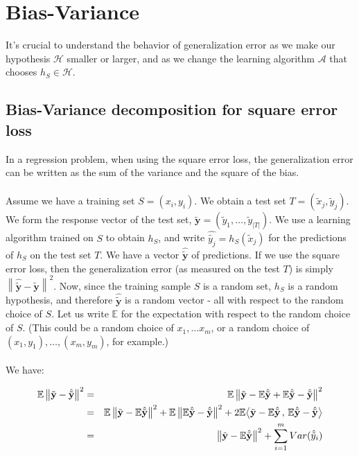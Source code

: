 \documentclass[11pt]{article}
\newcommand{\norm}[1]{\left\| #1\right\|}
\newcommand{\Ac}{\mathcal{A}}
\newcommand{\Hc}{\mathcal{H}}
\newcommand{\innerr}[2]{{\left\langle #1\,,\,#2 \right\rangle}}
\newcommand{\V}[1]{\mathbf{#1}}
\begin{document}
\section{Bias-Variance}

It's crucial to understand the behavior of generalization error as we make our
hypothesis $\Hc$ smaller or larger, and as we change the learning algorithm
$\Ac$ that chooses $h_S\in\Hc$. 


\subsection{Bias-Variance decomposition for square error loss}

In a regression problem, when using the square error loss, the generalization
error can be written as the sum of the variance and the square of the bias. 
\\~\\
Assume we have a training set $S={(x_i,y_i)}$. 
       We obtain a test set $T=(\tilde{x}_j,\tilde{y}_j)$. 
       We form the response vector of the test set,
       $\tilde{\V{y}}=(\tilde{y}_1,\ldots,\tilde{y}_{|T|})$.
      We use a learning algorithm trained on $S$ to obtain $h_S$, 
      and write $\hat{\tilde{y_j}}=h_S(\tilde{x}_j)$  for the predictions
      of $h_S$ on the test set $T$. We have a vector $\hat{\tilde{\V{y}}}$ of
      predictions. If we use the square error loss, then the 
      generalization error (as measured  on the test $T$) is simply
    $\norm{\hat{\tilde{\V{y}}}-\tilde{\V{y}}}^2$. 
      Now, since the training sample $S$ is a random set, $h_S$ is a random
      hypothesis, and
      therefore $\hat{\tilde{\V{y}}}$ is a random vector - all with respect to
      the random choice of $S$. 
      Let us  write $\mathbb{E}$ for the expectation with respect to the random
      choice of $S$. (This could be a random choice of $x_1,\ldots x_m$, or
    a random choice of $(x_1,y_1),\ldots,(x_m,y_m)$, for example.) 
\\~\\
      We have:


       \begin{eqnarray*}
         \E \norm{\tilde{\V{y}}-\hat{\tilde{\V{y}}}}^2 &=& 
         \E \norm{\tilde{\V{y}}-\E\hat{\tilde{\V{y}}} + \E \hat{\tilde{\V{y}}} -
         \hat{\tilde{\V{y}}}}^2 \\
         &=&  
         \E \norm{\tilde{\V{y}}-\E\hat{\tilde{\V{y}}} }^2
         +
         \E \norm{ \E \hat{\tilde{\V{y}}} -
         \hat{\tilde{\V{y}}}}^2
         + 2 \E \innerr{ 
           \tilde{\V{y}}-\E\hat{\tilde{\V{y}}} 
         }
         {
           \E \hat{\tilde{\V{y}}} -
         \hat{\tilde{\V{y}}}
         }\\
&=& 
    \norm{\tilde{\V{y}}-\E\hat{\tilde{\V{y}}} }^2
         +
         \sum_{i=1}^m Var(\hat{\tilde{y}}_i)
       \end{eqnarray*}
\end{document}
